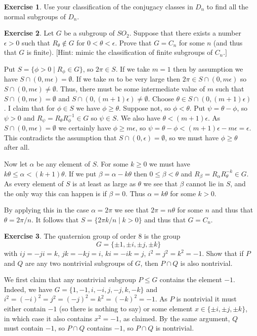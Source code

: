\documentclass{amsart}
\renewcommand{\:}{\colon}
\newcommand{\st}{\;|\;}
\newcommand{\al}        {\alpha}
\newcommand{\bt}        {\beta}
\newcommand{\ep}        {\epsilon}
\newcommand{\tht}       {\theta}
\theoremstyle{definition}
\newtheorem{exercise}{Exercise}
\newenvironment{solution}{{\noindent\bf Solution:}}{}
\begin{document}
\begin{exercise}
 Use your classification of the conjugacy classes in $D_n$ to find all
 the normal subgroups of $D_n$.
\end{exercise}
\begin{solution}

\end{solution}

\begin{exercise}
 Let $G$ be a subgroup of $SO_2$.  Suppose that there exists a number
 $\ep>0$ such that $R_\tht\not\in G$ for $0<\tht<\ep$.  Prove that
 $G=C_n$ for some $n$ (and thus that $G$ is finite).  [Hint: mimic the
 classification of finite subgroups of $C_n$.]
\end{exercise}
\begin{solution}
 Put $S=\{\phi>0\st R_\phi\in G\}$, so $2\pi\in S$.  If we take $m=1$
 then by assumption we have $S\cap(0,m\ep)=\emptyset$.  If we take $m$
 to be very large then $2\pi\in S\cap(0,m\ep)$ so
 $S\cap(0,m\ep)\neq\emptyset$.  Thus, there must be some intermediate
 value of $m$ such that $S\cap(0,m\ep)=\emptyset$ and
 $S\cap(0,(m+1)\ep)\neq\emptyset$.  Choose
 $\tht\in S\cap(0,(m+1)\ep)$.  I claim that for $\phi\in S$ we have
 $\phi\geq\tht$.  Suppose not, so $\phi<\tht$.  Put $\psi=\tht-\phi$,
 so $\psi>0$ and $R_\psi=R_\tht R_\phi^{-1}\in G$ so $\psi\in S$.  
 We also have $\tht<(m+1)\ep$.  As $S\cap(0,m\ep)=\emptyset$ we
 certainly have $\phi\geq m\ep$, so
 $\psi=\tht-\phi<(m+1)\ep-m\ep=\ep$.  This contradicts the assumption
 that $S\cap(0,\ep)=\emptyset$, so we must have $\phi\geq\tht$ after
 all.  

 Now let $\al$ be any element of $S$.  For some $k\geq 0$ we must have
 $k\tht\leq\al<(k+1)\tht$.  If we put $\bt=\al-k\tht$ then
 $0\leq\bt<\tht$ and $R_\bt=R_\al R_\tht^{-k}\in G$.  As every element
 of $S$ is at least as large as $\tht$ we see that $\bt$ cannot lie in
 $S$, and the only way this can happen is if $\bt=0$.  Thus
 $\al=k\tht$ for some $k>0$.

 By applying this in the case $\al=2\pi$ we see that $2\pi=n\tht$ for
 some $n$ and thus that $\tht=2\pi/n$.  It follows that
 $S=\{2\pi k/n\st k>0\}$ and thus that $G=C_n$.
\end{solution}

\begin{exercise}
 The quaternion group of order 8  is the group
 \[ G = \{\pm 1, \pm i, \pm j, \pm k \} \]
 with $ij=-ji=k$, $jk=-kj=i$, $ki=-ik=j$, $i^2=j^2=k^2=-1$. 
 Show that if $P$ and $Q$ are any two nontrivial subgroups of $G$,
 then $P\cap Q$ is also nontrivial.
\end{exercise}
\begin{solution}
 We first claim that any nontrivial subgroup $P\leq G$ contains the
 element $-1$.  Indeed, we have $G=\{1,-1,i,-i,j,-j,k,-k\}$ and
 $i^2=(-i)^2=j^2=(-j)^2=k^2=(-k)^2=-1$.  As $P$ is nontrivial it must
 either contain $-1$ (so there is nothing to say) or some element
 $x\in\{\pm i,\pm j,\pm k\}$, in which case it also contains $x^2=-1$,
 as claimed.  By the same argument, $Q$ must contain $-1$, so
 $P\cap Q$ contains $-1$, so $P\cap Q$ is nontrivial.
\end{solution}
\end{document}
